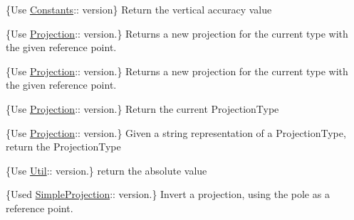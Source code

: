 \begin{DoxyRefList}
\{Use \mbox{\hyperlink{classlarcfm_1_1_constants}{Constants}}\+:\+: version\} Return the vertical accuracy value  
\item[Member \mbox{\hyperlink{namespacelarcfm_af16dc2244bd354af537fe68aee7bf560}{larcfm\+::get\+Projection}} (double lat, double lon, double alt)]\label{deprecated__deprecated000016}%
%
\{Use \mbox{\hyperlink{classlarcfm_1_1_projection}{Projection}}\+:\+: version.\} Returns a new projection for the current type with the given reference point.  
\item[Member \mbox{\hyperlink{namespacelarcfm_aaf91553105d151a8775f5fa8c02c4631}{larcfm\+::get\+Projection}} (const \mbox{\hyperlink{classlarcfm_1_1_lat_lon_alt}{Lat\+Lon\+Alt}} \&lla)]\label{deprecated__deprecated000017}%
%
\{Use \mbox{\hyperlink{classlarcfm_1_1_projection}{Projection}}\+:\+: version.\} Returns a new projection for the current type with the given reference point.  
\item[Member \mbox{\hyperlink{namespacelarcfm_ad89c78d0c0a0425d920383523814d320}{larcfm\+::get\+Projection\+Type}} ()]\label{deprecated__deprecated000022}%
%
\{Use \mbox{\hyperlink{classlarcfm_1_1_projection}{Projection}}\+:\+: version.\} Return the current Projection\+Type  
\item[Member \mbox{\hyperlink{namespacelarcfm_a69fb6b8c08c1134ce7d2f8cadc343064}{larcfm\+::get\+Projection\+Type\+From\+String}} (std\+::string s)]\label{deprecated__deprecated000021}%
%
\{Use \mbox{\hyperlink{classlarcfm_1_1_projection}{Projection}}\+:\+: version.\} Given a string representation of a Projection\+Type, return the Projection\+Type  
\item[Member \mbox{\hyperlink{namespacelarcfm_ade6ccf1fb1c7aa8430991b9ef50c8690}{larcfm\+::llabs}} (const INT64\+FM x)]\label{deprecated__deprecated000026}%
%
\{Use \mbox{\hyperlink{classlarcfm_1_1_util}{Util}}\+:\+: version.\} return the absolute value  
\item[Member \mbox{\hyperlink{namespacelarcfm_addd8ea28f7c1a83b84ccea44bd04a94c}{larcfm\+::polar\+\_\+inverse}} (const \mbox{\hyperlink{classlarcfm_1_1_vect2}{Vect2}} \&v, double alt, bool north)]\label{deprecated__deprecated000024}%
%
\{Used \mbox{\hyperlink{classlarcfm_1_1_simple_projection}{Simple\+Projection}}\+:\+: version.\} Invert a projection, using the pole as a reference point.  

\end{DoxyRefList}
